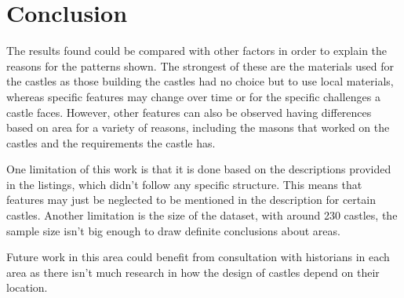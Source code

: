 \documentclass[12pt]{article}
\begin{document}
\section{Conclusion}

The results found could be compared with other factors in order to explain the reasons for the patterns shown. The strongest of these are the materials used for the castles as those building the castles had no choice but to use local materials, whereas specific features may change over time or for the specific challenges a castle faces. However, other features can also be observed having differences based on area for a variety of reasons, including the masons that worked on the castles and the requirements the castle has.

One limitation of this work is that it is done based on the descriptions provided in the listings, which didn't follow any specific structure. This means that features may just be neglected to be mentioned in the description for certain castles. Another limitation is the size of the dataset, with around 230 castles, the sample size isn't big enough to draw definite conclusions about areas.

Future work in this area could benefit from consultation with historians in each area as there isn't much research in how the design of castles depend on their location.



\newpage
\printbibliography


\end{document}
